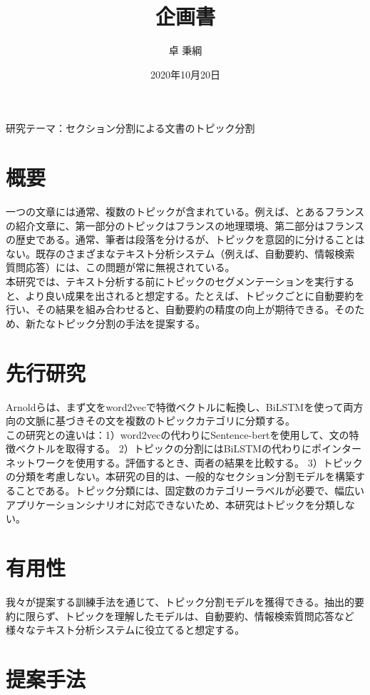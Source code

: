 \documentclass[a4paper]{article}
\title{企画書}
\date{2020年10月20日}
\author{卓 秉綱}
\begin{document}
\maketitle
研究テーマ：セクション分割による文書のトピック分割

\section{概要}

一つの文章には通常、複数のトピックが含まれている。例えば、とあるフランスの紹介文章に、第一部分のトピックはフランスの地理環境、第二部分はフランスの歴史である。通常、筆者は段落を分けるが、トピックを意図的に分けることはない。既存のさまざまなテキスト分析システム（例えば、自動要約、情報検索 質問応答）には、この問題が常に無視されている。\\

本研究では、テキスト分析する前にトピックのセグメンテーションを実行すると、より良い成果を出されると想定する。たとえば、トピックごとに自動要約を行い、その結果を組み合わせると、自動要約の精度の向上が期待できる。そのため、新たなトピック分割の手法を提案する。

\section{先行研究}

Arnoldら\cite{arnold2019sector}は、まず文をword2vecで特徴ベクトルに転換し、BiLSTMを使って両方向の文脈に基づきその文を複数のトピックカテゴリに分類する。\\

この研究との違いは：1）word2vecの代わりにSentence-bertを使用して、文の特徴ベクトルを取得する。 2）トピックの分割にはBiLSTMの代わりにポインターネットワークを使用する。評価するとき、両者の結果を比較する。 3）トピックの分類を考慮しない。本研究の目的は、一般的なセクション分割モデルを構築することである。トピック分類には、固定数のカテゴリーラベルが必要で、幅広いアプリケーションシナリオに対応できないため、本研究はトピックを分類しない。


\section{有用性}

我々が提案する訓練手法を通じて、トピック分割モデルを獲得できる。抽出的要約に限らず、トピックを理解したモデルは、自動要約、情報検索質問応答など様々なテキスト分析システムに役立てると想定する。

\section{提案手法}
\end{document}
